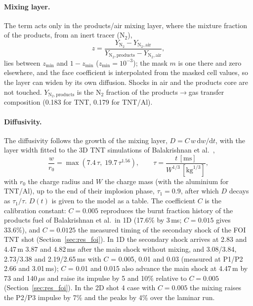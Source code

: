 \documentclass{article}
\begin{document}
\paragraph{Mixing layer.} The term acts only in the products/air mixing layer, where the mixture fraction of the products, from an inert tracer (N$_2$),
\begin{equation}
    z = \frac{Y_{\text{N}_2} - Y_{\text{N}_2,\text{air}}}{Y_{\text{N}_2,\text{products}} - Y_{\text{N}_2,\text{air}}},
\end{equation}
lies between $z_\text{min}$ and $1 - z_\text{min}$ ($z_\text{min} = 10^{-3}$); the mask $m$ is one there and zero elsewhere, and the face coefficient is interpolated from the masked cell values, so the layer can widen by its own diffusion. Shocks in air and the products core are not touched. $Y_{\text{N}_2,\text{products}}$ is the N$_2$ fraction of the products$\to$gas transfer composition (0.183 for TNT, 0.179 for TNT/Al).

\paragraph{Diffusivity.} The diffusivity follows the growth of the mixing layer, $D = C\,w\,\mathrm{d}w/\mathrm{d}t$, with the layer width fitted to the 3D TNT simulations of Balakrishnan et al.\ \cite{balakrishnan2010},
\begin{equation}
    \frac{w}{r_0} = \max\left(7.4\,\tau,\; 19.7\,\tau^{1.56}\right), \qquad \tau = \frac{t\,[\text{ms}]}{W^{1/3}\,[\text{kg}^{1/3}]},
\end{equation}
with $r_0$ the charge radius and $W$ the charge mass (with the aluminium for TNT/Al), up to the end of their implosion phase, $\tau_1 = 0.9$, after which $D$ decays as $\tau_1/\tau$. $D(t)$ is given to the model as a table. The coefficient $C$ is the calibration constant: $C = 0.005$ reproduces the burnt fraction history of the products fuel of Balakrishnan et al.\ in 1D (17.6\% by 3\,ms; $C = 0.015$ gives 33.6\%), and $C = 0.0125$ the measured timing of the secondary shock of the FOI TNT shot (Section~\ref{sec:res_foi}). In 1D the secondary shock arrives at 2.83 and 4.47\,m 3.87 and 4.82\,ms after the main shock without mixing, and 3.08/3.84, 2.73/3.38 and 2.19/2.65\,ms with $C$ = 0.005, 0.01 and 0.03 (measured at P1/P2 2.66 and 3.01\,ms); $C$ = 0.01 and 0.015 also advance the main shock at 4.47\,m by 73 and 140\,$\mu$s and raise its impulse by 5 and 10\% relative to $C = 0.005$ (Section~\ref{sec:res_foi}). In the 2D shot 4 case with $C = 0.005$ the mixing raises the P2/P3 impulse by 7\% and the peaks by 4\% over the laminar run.
\end{document}
